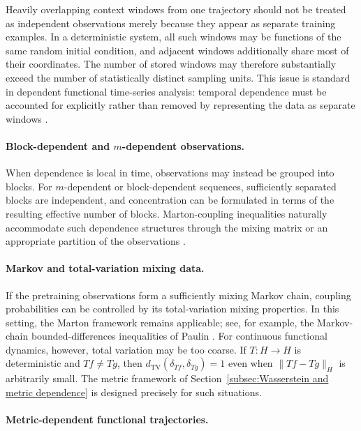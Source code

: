 Heavily overlapping context windows from one trajectory should not be treated as independent observations merely because they appear as separate training examples. In a deterministic system, all such windows may be functions of the same random initial condition, and adjacent windows additionally share most of their coordinates. The number of stored windows may therefore substantially exceed the number of statistically distinct sampling units.
This issue is standard in dependent functional time-series analysis: temporal dependence must be accounted for explicitly rather than removed by representing the data as separate windows \cite{HormannKokoszka2010}.

\paragraph{Block-dependent and \(m\)-dependent observations.}

When dependence is local in time, observations may instead be grouped into blocks. For \(m\)-dependent or block-dependent sequences, sufficiently separated blocks are independent, and concentration can be formulated in terms of the resulting effective number of blocks. Marton-coupling inequalities naturally accommodate such dependence structures through the mixing matrix or an appropriate partition of the observations \cite{Paulin2015}.

\paragraph{Markov and total-variation mixing data.}

If the pretraining observations form a sufficiently mixing Markov chain, coupling probabilities can be controlled by its total-variation mixing properties. In this setting, the Marton framework remains applicable; see, for example, the Markov-chain bounded-differences inequalities of Paulin \cite{Paulin2015}.
For continuous functional dynamics, however, total variation may be too coarse. If \(T:H\to H\) is deterministic and \(Tf\neq Tg\), then
\(
d_{\mathrm{TV}}(\delta_{Tf},\delta_{Tg})=1
\)
even when \(\|Tf-Tg\|_H\) is arbitrarily small. The metric framework of Section~\ref{subsec:Wasserstein and metric dependence} is designed precisely for such situations.

\paragraph{Metric-dependent functional trajectories.}


